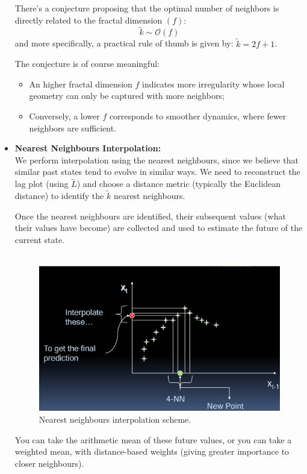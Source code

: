 \begin{itemize}
    
    There's a conjecture proposing that the optimal number of neighbors is directly related to the fractal dimension $(f)$:
    \begin{equation*}
        \tilde{k} \sim  \mathcal{O}(f)
    \end{equation*}
    and more specifically, a practical rule of thumb is given by: $\tilde{k}=2f+1$.


    The conjecture is of course meaningful:
    \begin{itemize}
        \item An higher fractal dimension $f$ indicates more irregularity whose local geometry  can only be captured with more neighbors;
        \item Conversely, a lower $f$ corresponds to smoother dynamics, where fewer neighbors are sufficient.
    \end{itemize}
    \item \textbf{Nearest Neighbours Interpolation:}\\
    We perform interpolation using the nearest neighbours, since we believe that similar past states tend to evolve in similar ways. 
    We need to reconstruct the lag plot (using $\tilde{L}$) and choose a distance metric (typically the Euclidean distance) to identify the $\tilde{k}$ nearest neighbours.

    Once the nearest neighbours are identified, their subsequent values (what their values have become) are collected and used to estimate the future of the current state.\\
    \\
\begin{figure} [H]
    \centering
    \includegraphics[width=0.75\linewidth]{img/interpolation.png}
    \caption{Nearest neighbours interpolation scheme.}
\end{figure}
    You can take the arithmetic mean of these future values, or you can take a weighted mean, with distance-based weights (giving greater importance to closer neighbours).
\end{itemize}

